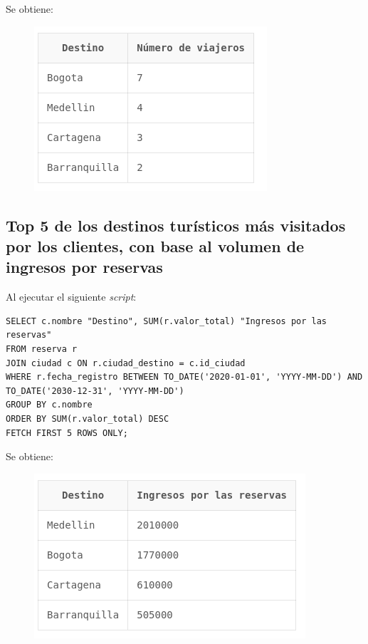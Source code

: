 \documentclass{article}
\begin{document}
Se obtiene:

\begin{figure}[h]
    \centering
    \includegraphics[width=0.75\linewidth]{img/Consulta_4.png}
\end{figure}


\newpage

\subsection{Top 5 de los destinos turísticos más visitados por los clientes, con base al volumen de ingresos por reservas}
Al ejecutar el siguiente \textit{script}:
\begin{lstlisting}
SELECT c.nombre "Destino", SUM(r.valor_total) "Ingresos por las reservas"
FROM reserva r
JOIN ciudad c ON r.ciudad_destino = c.id_ciudad
WHERE r.fecha_registro BETWEEN TO_DATE('2020-01-01', 'YYYY-MM-DD') AND TO_DATE('2030-12-31', 'YYYY-MM-DD')
GROUP BY c.nombre
ORDER BY SUM(r.valor_total) DESC
FETCH FIRST 5 ROWS ONLY;
\end{lstlisting}

Se obtiene:

\begin{figure}[h]
    \centering
    \includegraphics[width=0.75\linewidth]{img/Consulta_5.png}
\end{figure}
\end{document}
